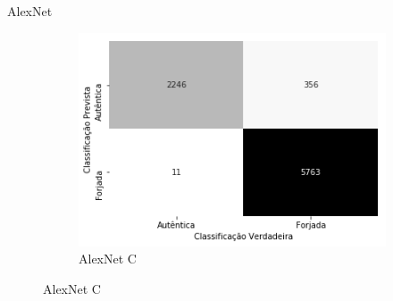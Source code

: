 \begin{frame}{AlexNet}
\begin{figure}[ht!]
      \begin{subfigure}{0.3\linewidth}
        \caption{AlexNet C}
        \includegraphics[width=\linewidth]{img/matriz-alexnet-c}%
      \end{subfigure}
  \end{figure}
\end{frame}
